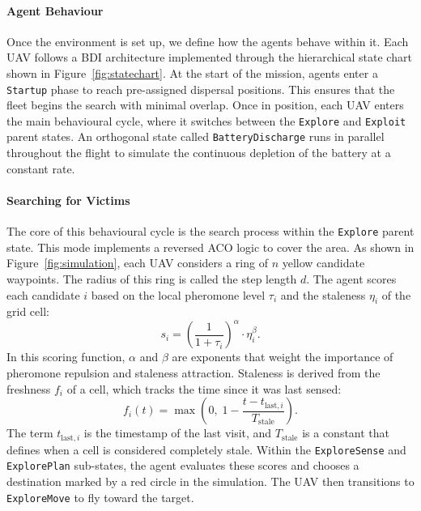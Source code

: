 \paragraph{Agent Behaviour}
Once the environment is set up, we define how the agents behave within it. Each UAV follows a BDI architecture implemented through the hierarchical state chart shown in Figure~\ref{fig:statechart}. At the start of the mission, agents enter a \texttt{Startup} phase to reach pre-assigned dispersal positions. This ensures that the fleet begins the search with minimal overlap. Once in position, each UAV enters the main behavioural cycle, where it switches between the \texttt{Explore} and \texttt{Exploit} parent states. An orthogonal state called \texttt{BatteryDischarge} runs in parallel throughout the flight to simulate the continuous depletion of the battery at a constant rate.

\paragraph{Searching for Victims}
The core of this behavioural cycle is the search process within the \texttt{Explore} parent state. This mode implements a reversed ACO logic to cover the area. As shown in Figure~\ref{fig:simulation}, each UAV considers a ring of $n$ yellow candidate waypoints. The radius of this ring is called the step length $d$. The agent scores each candidate $i$ based on the local pheromone level $\tau_i$ and the staleness $\eta_i$ of the grid cell:
\begin{equation}
    s_i = \left(\frac{1}{1 + \tau_i}\right)^{\alpha} \cdot \eta_i^{\beta} .
\end{equation}
In this scoring function, $\alpha$ and $\beta$ are exponents that weight the importance of pheromone repulsion and staleness attraction. Staleness is derived from the freshness $f_i$ of a cell, which tracks the time since it was last sensed:
\begin{equation}
    f_i(t) = \max\left(0,\; 1 - \frac{t - t_{\mathrm{last},i}}{T_{\mathrm{stale}}}\right) .
\end{equation}
The term $t_{\mathrm{last},i}$ is the timestamp of the last visit, and $T_{\mathrm{stale}}$ is a constant that defines when a cell is considered completely stale. Within the \texttt{ExploreSense} and \texttt{ExplorePlan} sub-states, the agent evaluates these scores and chooses a destination marked by a red circle in the simulation. The UAV then transitions to \texttt{ExploreMove} to fly toward the target.

